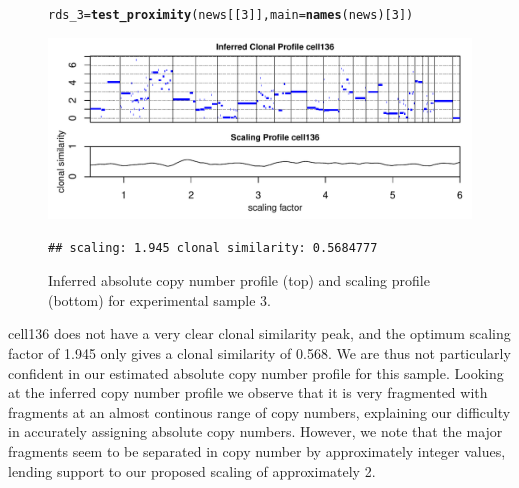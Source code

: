 \documentclass[12pt]{article}\usepackage[]{graphicx}\usepackage[]{color}
\makeatletter
\newcommand{\hlnum}[1]{\textcolor[rgb]{0.686,0.059,0.569}{#1}}%
\newcommand{\hlstd}[1]{\textcolor[rgb]{0.345,0.345,0.345}{#1}}%
\newcommand{\hlkwb}[1]{\textcolor[rgb]{0.69,0.353,0.396}{#1}}%
\newcommand{\hlkwc}[1]{\textcolor[rgb]{0.333,0.667,0.333}{#1}}%
\newcommand{\hlkwd}[1]{\textcolor[rgb]{0.737,0.353,0.396}{\textbf{#1}}}%
\newenvironment{kframe}{%
 \def\at@end@of@kframe{}%
 \ifinner\ifhmode%
  \def\at@end@of@kframe{\end{minipage}}%
  \begin{minipage}{\columnwidth}%
 \fi\fi%
 \def\FrameCommand##1{\hskip\@totalleftmargin \hskip-\fboxsep
 \colorbox{shadecolor}{##1}\hskip-\fboxsep
     \hskip-\linewidth \hskip-\@totalleftmargin \hskip\columnwidth}%
 \MakeFramed {\advance\hsize-\width
   \@totalleftmargin\z@ \linewidth\hsize
   \@setminipage}}%
 {\par\unskip\endMakeFramed%
 \at@end@of@kframe}
\newenvironment{knitrout}{}{} %
\makeatother
\begin{document}
\begin{figure}[h!]
  \centering
\begin{knitrout}
\color{fgcolor}\begin{kframe}
\begin{alltt}
\hlstd{rds_3} \hlkwb{=} \hlkwd{test_proximity}\hlstd{(news[[}\hlnum{3}\hlstd{]],} \hlkwc{main} \hlstd{=} \hlkwd{names}\hlstd{(news)[}\hlnum{3}\hlstd{])}
\end{alltt}
\end{kframe}
\includegraphics[width=.95\linewidth]{figure/unnamed-chunk-17-1} 
\begin{kframe}\begin{verbatim}
## scaling: 1.945 clonal similarity: 0.5684777
\end{verbatim}
\end{kframe}
\end{knitrout}
\caption{Inferred absolute copy number profile (top) and scaling profile (bottom) for experimental sample 3.}
\label{fig:samp3}
\end{figure}

cell136 does not have a very clear clonal similarity peak, and the optimum scaling factor of 1.945 only gives a clonal similarity of 0.568. We are thus not particularly confident in our estimated absolute copy number profile for this sample. Looking at the inferred copy number profile we observe that it is very fragmented with fragments at an almost continous range of copy numbers, explaining our difficulty in accurately assigning absolute copy numbers. However, we note that the major fragments seem to be separated in copy number by approximately integer values, lending support to our proposed scaling of approximately 2.
\end{document}
